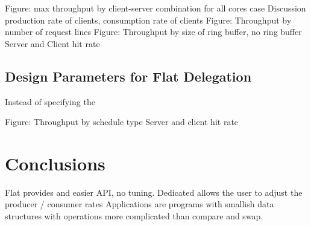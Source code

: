 \documentclass{uicthesi}
\begin{document}


Figure: max throughput by client-server combination for all cores case
	Discussion production rate of clients, consumption rate of clients
Figure: Throughput by number of request lines
Figure: Throughput by size of ring buffer, no ring buffer
	Server and Client hit rate

\section{Design Parameters for Flat Delegation}

Instead of specifying the 

Figure: Throughput by schedule type
	Server and client hit rate

\chapter{Conclusions}
Flat provides and easier API, no tuning. 
Dedicated allows the user to adjust the producer / consumer rates
Applications are programs with smallish data structures with operations more complicated than compare and swap. 
\end{document}
